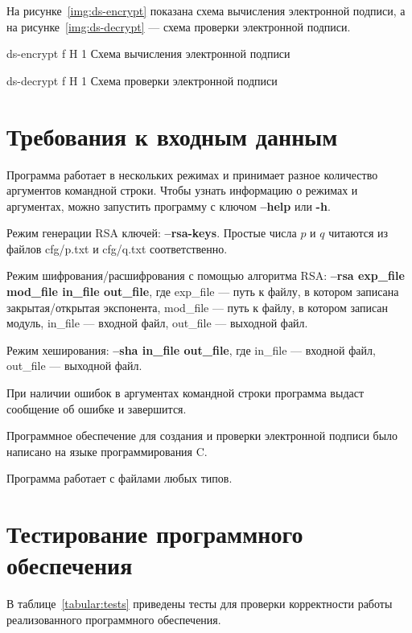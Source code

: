 \documentclass{bmstu}
\begin{document}
На рисунке~\ref{img:ds-encrypt} показана схема вычисления электронной подписи, а на рисунке~\ref{img:ds-decrypt} --- схема проверки электронной подписи.

    {ds-encrypt}
    {f}
    {H}
    {1\textwidth}
    {Схема вычисления электронной подписи~\cite{hacker}}
    
    {ds-decrypt}
    {f}
    {H}
    {1\textwidth}
    {Схема проверки электронной подписи~\cite{hacker}}

\chapter{Требования к входным данным}

Программа работает в нескольких режимах и принимает разное количество аргументов командной строки. 
Чтобы узнать информацию о режимах и аргументах, можно запустить программу с ключом \textbf{--help} или \textbf{-h}.

Режим генерации RSA ключей: \textbf{--rsa-keys}. 
Простые числа $p$ и $q$ читаются из файлов cfg/p.txt и cfg/q.txt соответственно.

Режим шифрования/расшифрования с помощью алгоритма RSA: \textbf{--rsa exp\_file mod\_file in\_file out\_file}, где exp\_file --- путь к файлу, в котором записана закрытая/открытая экспонента, mod\_file --- путь к файлу, в котором записан модуль, in\_file --- входной файл, out\_file --- выходной файл.

Режим хеширования: \textbf{--sha in\_file out\_file}, где in\_file --- входной файл, out\_file --- выходной файл.

При наличии ошибок в аргументах командной строки программа выдаст сообщение об ошибке и завершится.

Программное обеспечение для создания и проверки электронной подписи было написано на языке программирования C.

Программа работает с файлами любых типов.

\chapter{Тестирование программного обеспечения}

В таблице~\ref{tabular:tests} приведены тесты для проверки корректности работы реализованного программного обеспечения.
\end{document}
